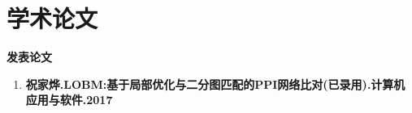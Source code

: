 \chapter*{学术论文}

\textbf{发表论文}
\begin{enumerate}
\item \textbf{祝家烨.LOBM:基于局部优化与二分图匹配的PPI网络比对(已录用).计算机应用与软件.2017}
\end{enumerate}